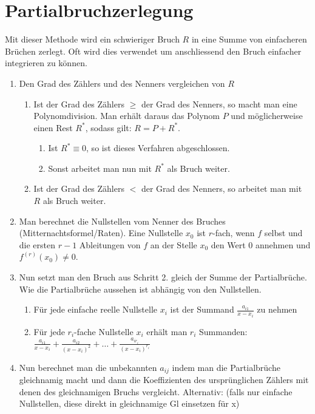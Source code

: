 \section{Partialbruchzerlegung}
Mit dieser Methode wird ein schwieriger Bruch $R$ in eine Summe von einfacheren
Brüchen zerlegt. Oft wird dies verwendet um anschliessend den Bruch einfacher integrieren zu können.

\begin{enumerate}
	\item Den Grad des Zählers und des Nenners vergleichen von $R$
	\begin{enumerate}
		\item Ist der Grad des Zählers $\geq$ der Grad des Nenners, so macht man eine 
		Polynomdivision. Man erhält daraus das Polynom $P$ und möglicherweise einen 
		Rest $R^*$, sodass gilt: $R = P + R^*$.
		\begin{enumerate}
			\item Ist $R^* \equiv 0$, so ist dieses Verfahren abgeschlossen.
			\item Sonst arbeitet man nun mit $R^*$ als Bruch weiter.
		\end{enumerate}
		\item Ist der Grad des Zählers $<$ der Grad des Nenners, so arbeitet man mit $R$ als Bruch weiter.
	\end{enumerate}
	\item Man berechnet die Nullstellen vom Nenner des Bruches (Mitternachtsformel/Raten). 
	Eine Nullstelle $x_0$ ist $r$-fach, wenn $f$ selbst und die ersten $r-1$ Ableitungen von $f$ an der Stelle $x_0$ den Wert $0$ annehmen und $f^{(r)}(x_0) \neq 0$.
	\item Nun setzt man den Bruch aus Schritt 2. gleich der Summe der
	Partialbrüche. Wie die Partialbrüche aussehen ist abhängig von den Nullstellen.  
	\begin{enumerate}
		\item Für jede einfache reelle Nullstelle $x_i$ ist der Summand
		$\frac{a_{i1}}{x-x_i}$ zu nehmen
		\item Für jede $r_i$-fache Nullstelle $x_i$ erhält man $r_i$ Summanden:
		$\frac{a_{i1}}{x-x_i} + \frac{a_{i2}}{(x-x_i)^2} + \ldots +
		\frac{a_{ir_i}}{(x-x_i)^{r_i}}$
	\end{enumerate}
	\item Nun berechnet man die unbekannten $a_{ij}$ indem man die Partialbrüche
	gleichnamig macht und dann die Koeffizienten des ursprünglichen Zählers mit
	denen des gleichnamigen Bruchs vergleicht. Alternativ: (falls nur einfache Nullstellen, diese 
	direkt in gleichnamige Gl einsetzen für x)
\end{enumerate}

